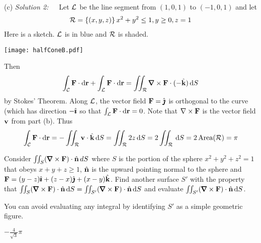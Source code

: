 \begin{solution}
(c) \emph{Solution 2:}\ \ \ 
Let $\mathcal{L}$ be the  line segment from $(1,0,1)$ to $(-1,0,1)$ and
let 
\begin{align*}
\mathcal{R}=\left\{(x,y,z)\right\}{x^2+y^2\le1, y\ge 0, z=1}
\end{align*}
Here is a sketch. $\mathcal{L}$ is in blue and $\mathcal{R}$ is shaded.

\begin{center}
     \texttt{[image: halfConeB.pdf]}
\end{center}

Then
\begin{equation*}
\int_\cC \vF \cdot \dee{\vr} + \int_\cL \vF \cdot \dee{\vr} 
= \dblInt_{\cR} \vnabla \times \vF \cdot (-\hk)\, \dee{S}
\end{equation*}
by Stokes' Theorem. Along $\mathcal{L}$, the vector field $\mathbf{F}=\hat{\pmb{\jmath}}$ is orthogonal 
to the curve (which has direction $-\hat{\pmb{\imath}}$ so that $\int_{\mathcal{L}} \mathbf{F}\cdot \mathrm{d}\mathbf{r}=0$. Note that 
$\nabla\times \mathbf{F}$ is the vector field $\mathbf{v}$ from part (b). 
Thus
\begin{equation*}
\int_{\mathcal{C}} \mathbf{F}\cdot \mathrm{d}\mathbf{r} = -\iint_{\mathcal{R}} \mathbf{v} \cdot \hat{\mathbf{k}}\, \mathrm{d}S
= \iint_{\mathcal{R}} 2z \, \mathrm{d}S 
= 2\iint_{\mathcal{R}} \, \mathrm{d}S 
=2\,\text{Area}(\mathcal{R})
= \pi
\end{equation*}

\end{solution}

\begin{question}
Consider $\dblInt_S(\vnabla\times\vF)\cdot\hn\,dS$ where $S$
is the portion of the sphere $x^2+y^2+z^2=1$ that obeys $x+y+z\ge 1$, $\hat{\mathbf{n}}$
is the upward pointing normal to the sphere and
 $\mathbf{F}=(y-z)\hat{\pmb{\imath}}+(z-x)\hat{\pmb{\jmath}}+(x-y)\hat{\mathbf{k}}$. Find another
surface $S'$ with the property that $\dblInt_S(\vnabla\times\vF)\cdot\hn\,\dee{S}
=\dblInt_{S'}(\vnabla\times\vF)\cdot\hn\,\dee{S}$ and evaluate
$\dblInt_{S'}(\vnabla\times\vF)\cdot\hn\,\dee{S}$.
\end{question}

\begin{hint} 
You can avoid evaluating any integral
by identifying $S'$ as a simple geometric figure.
\end{hint}

\begin{answer} 
$-\frac{4}{\sqrt{3}}\pi$
\end{answer}

